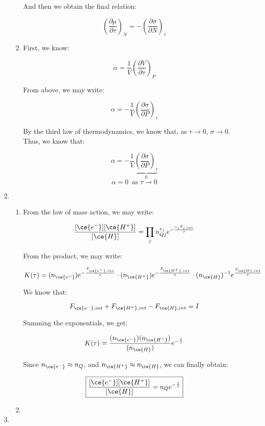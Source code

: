 \begin{enumerate}
\begin{enumerate}
        And then we obtain the final relation:

        $$\boxed{\left( \frac{\partial\mu}{\partial\tau} \right)_N=-\left( \frac{\partial\sigma}{\partial N} \right)_\tau}$$

      \item 

        First, we know:

        $$\alpha=\frac{1}{V}\left( \frac{\partial V}{\partial\tau} \right)_P$$

        From above, we may write:

        $$\alpha=-\frac{1}{V}\left( \frac{\partial \sigma}{\partial P} \right)_\tau$$

        By the third law of thermodynamics, we know that, as $\tau\to0$, $\sigma\to0$. Thus, we know that:

        $$\boxed{\alpha=-\frac{1}{V}\underbrace{\left( \frac{\partial \sigma}{\partial P} \right)_\tau}_0}$$
        $$\alpha=0\,\text{ as $\tau\to0$}$$

    \end{enumerate}

  \item

    \begin{enumerate}

      \item 

        From the law of mass action, we may write:

        $$\frac{[\ce{e^-}][\ce{H^+}]}{[\ce{H}]}=\prod_jn_{Qj}^{v_j}e^{-\frac{v_jF_{j,int}}{\tau}}$$

        From the product, we may write:

        $$K(\tau)=(n_{\ce{e^-}})e^{-\frac{F_{\ce{e^-},int}}{\tau}}\cdot(n_{\ce{H^+}})e^{-\frac{F_{\ce{H^+},int}}{\tau}}\cdot (n_{\ce{H}})^{-1}e^{\frac{F_{\ce{H},int}}{\tau}}$$

        We know that:

        $$F_{\ce{e^-},int}+F_{\ce{H^+},int}-F_{\ce{H},int}=I$$

        Summing the exponentials, we get:

        $$K(\tau)=\frac{(n_{\ce{e^-}})(n_{\ce{H^+}})}{(n_{\ce{H}})}e^{-\frac{I}{\tau}}$$

        Since $n_{\ce{e^-}}\approx n_Q$, and $n_{\ce{H^+}}\approx n_{\ce{H}}$, we can finally obtain:

        $$\boxed{\frac{[\ce{e^-}][\ce{H^+ }]}{[\ce{H}]}=n_Qe^{-\frac{I}{\tau}}}$$

      \item 

    \end{enumerate}

  \item

\end{enumerate}



